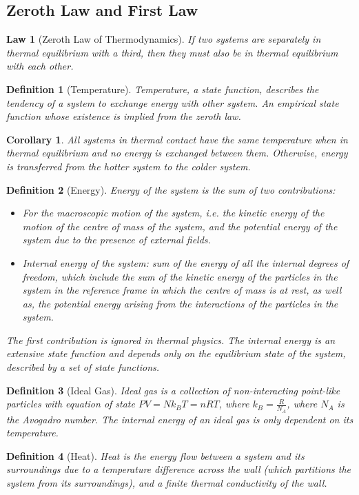 \documentclass[a4paper]{article}
\theoremstyle{new}
\newtheorem{law}{Law}[section]
\newtheorem{defi}{Definition}[section]
\newtheorem{cor}{Corollary}[section]
\begin{document}
\subsection{Zeroth Law and First Law}
\begin{law}[Zeroth Law of Thermodynamics]
If two systems are separately in thermal equilibrium with a third, then they must also be in thermal equilibrium with each other.
\end{law}
\begin{defi}[Temperature]
Temperature, a state function, describes the tendency of a system to exchange energy with other system. An empirical state function whose existence is implied from the zeroth law.
\end{defi}
\begin{cor}
All systems in thermal contact have the same temperature when in thermal equilibrium and no energy is exchanged between them. Otherwise, energy is transferred from the hotter system to the colder system.
\end{cor}
\begin{defi}[Energy]
Energy of the system is the sum of two contributions:
\begin{itemize}
    \item For the macroscopic motion of the system, i.e. the kinetic energy of the motion of the centre of mass of the system, and the potential energy of the system due to the presence of external fields. 
    \item Internal energy of the system: sum of the energy of all the internal degrees of freedom, which include the sum of the kinetic energy of the particles in the system in the reference frame in which the centre of mass is at rest, as well as, the potential energy arising from the interactions of the particles in the system.
\end{itemize}
The first contribution is ignored in thermal physics. The internal energy is an extensive state function and depends only on the equilibrium state of the system, described by a set of state functions.
\end{defi}
\begin{defi}[Ideal Gas]
Ideal gas is a collection of non-interacting point-like particles with equation of state $PV=Nk_BT=nRT$, where $k_B=\frac{R}{N_A}$, where $N_A$ is the Avogadro number. The internal energy of an ideal gas is only dependent on its temperature.
\end{defi}
\begin{defi}[Heat]
Heat is the energy flow between a system and its surroundings due to a temperature difference across the wall (which partitions the system from its surroundings), and a finite thermal conductivity of the wall.
\end{defi}
\end{document}
